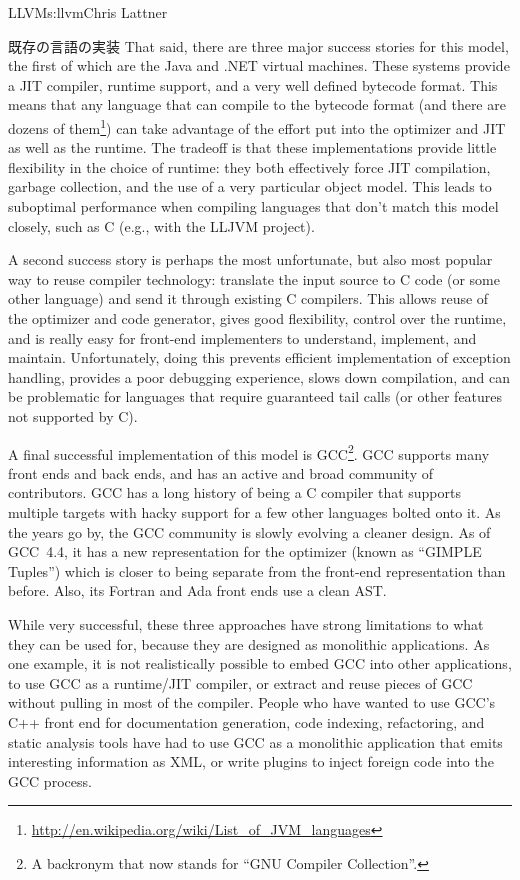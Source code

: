 \begin{aosachapter}{LLVM}{s:llvm}{Chris Lattner}
\begin{aosasect1}{既存の言語の実装}
That said, there are three major success stories for this model, the
first of which are the Java and .NET virtual machines.  These systems
provide a JIT compiler, runtime support, and a very well defined
bytecode format.  This means that any language that can compile to the
bytecode format (and there are dozens of
them\footnote{\url{http://en.wikipedia.org/wiki/List_of_JVM_languages}})
can take advantage of the effort put into the optimizer and JIT as
well as the runtime.  The tradeoff is that these implementations
provide little flexibility in the choice of runtime: they both
effectively force JIT compilation, garbage collection, and the use of
a very particular object model.  This leads to suboptimal performance
when compiling languages that don't match this model closely, such as
C (e.g., with the LLJVM project).

A second success story is perhaps the most unfortunate, but
also most popular way to reuse compiler technology: translate the input
source to C code (or some other language) and send it through existing
C compilers.  This allows reuse of the optimizer and code generator,
gives good flexibility, control over the runtime, and is really easy
for front-end implementers to understand, implement, and maintain.
Unfortunately, doing this prevents efficient implementation of
exception handling, provides a poor debugging experience, slows down
compilation, and can be problematic for languages that require guaranteed
tail calls (or other features not supported by C).

A final successful implementation of this model is GCC\footnote{A
backronym that now stands for ``GNU Compiler Collection''.}.  GCC
supports many front ends and back ends, and has an active and broad
community of contributors.  GCC has a long history of being a C
compiler that supports multiple targets with hacky support for a few
other languages bolted onto it.  As the years go by, the GCC community
is slowly evolving a cleaner design.  As of GCC~4.4, it has a new
representation for the optimizer (known as ``GIMPLE Tuples'') which is
closer to being separate from the front-end representation than
before.  Also, its Fortran and Ada front ends use a clean AST.

While very successful, these three approaches have strong limitations
to what they can be used for, because they are designed as monolithic
applications.  As one example, it is not realistically possible to
embed GCC into other applications, to use GCC as a runtime/JIT
compiler, or extract and reuse pieces of GCC without pulling in most
of the compiler.  People who have wanted to use GCC's C++ front end for
documentation generation, code indexing, refactoring, and static
analysis tools have had to use GCC as a monolithic application that
emits interesting information as XML, or write plugins to inject
foreign code into the GCC process.


\end{aosasect1}
\end{aosachapter}
